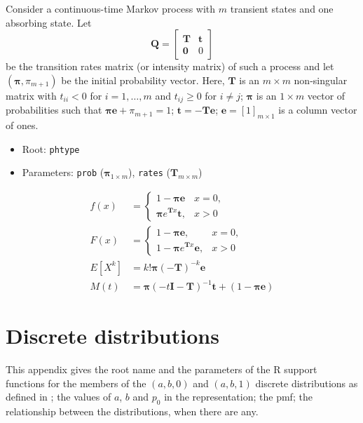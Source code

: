 \documentclass[x11names]{article}
\newcommand{\E}[1]{E[ #1 ]}
\newcommand{\mat}[1]{\mathbold{#1}} %
\newcommand{\proglang}[1]{\textsf{#1}}
\newcommand{\code}[1]{\texttt{#1}}
\begin{document}
Consider a continuous-time Markov process with $m$ transient
states and one absorbing state. Let
\begin{equation}
  \label{eq:Markov-transition-matrix}
  \mat{Q} =
  \begin{bmatrix}
    \mat{T} & \mat{t} \\
    \mat{0} & 0
  \end{bmatrix}
\end{equation}
be the transition rates matrix (or intensity matrix) of such a process
and let $(\mat{\pi}, \pi_{m + 1})$ be the initial probability vector.
Here, $\mat{T}$ is an $m \times m$ non-singular matrix with
$t_{ii} < 0$ for $i = 1, \dots, m$ and $t_{ij} \geq 0$ for $i \neq j$;
$\mat{\pi}$ is an $1 \times m$ vector of probabilities such that
$\mat{\pi} \mat{e} + \pi_{m + 1} = 1$; $\mat{t} = -\mat{T} \mat{e}$;
$\mat{e} = [1]_{m \times 1}$ is a column vector of ones. %
\bigskip

\begin{itemize}
\item Root: \code{phtype}
\item Parameters: \code{prob} ($\mat{\pi}_{1 \times m}$),
    \code{rates} ($\mat{T}_{m \times m}$)
\end{itemize}

\begin{align*}
  f(x)
  &=
    \begin{cases}
      1 - \mat{\pi} \mat{e} & x = 0, \\
      \mat{\pi} e^{\mat{T} x} \mat{t}, & x > 0
    \end{cases} \\
  F(x)
  &=
    \begin{cases}
      1 - \mat{\pi} \mat{e}, & x = 0, \\
      1 - \mat{\pi} e^{\mat{T} x} \mat{e}, & x > 0
    \end{cases} \\
  \E{X^k}
  &= k! \mat{\pi} (-\mat{T})^{-k} \mat{e} \\
  M(t)
  &= \mat{\pi} (-t \mat{I} - \mat{T})^{-1} \mat{t}
    + (1 - \mat{\pi} \mat{e})
\end{align*}


\section{Discrete distributions}
\label{sec:app:discrete}

This appendix gives the root name and the parameters of the
\proglang{R} support functions for the members of the $(a, b, 0)$ and
$(a, b, 1)$ discrete distributions as defined in \cite{LossModels4e};
the values of $a$, $b$ and $p_0$ in the representation; the pmf; the
relationship between the distributions, when there are any.
\end{document}
